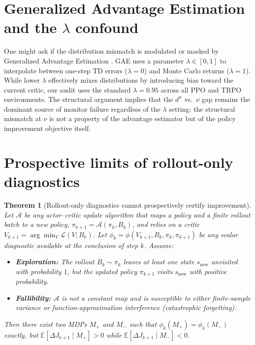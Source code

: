 \documentclass{article}
\newtheorem{theorem}{Theorem}
\begin{document}
\section{Generalized Advantage Estimation and the \texorpdfstring{$\lambda$}{lambda} confound}
\label{app:gae}

One might ask if the distribution mismatch is modulated or masked by Generalized Advantage Estimation \citep{schulman2015high}. GAE uses a parameter $\lambda \in [0,1]$ to interpolate between one-step TD errors ($\lambda=0$) and Monte Carlo returns ($\lambda=1$). While lower $\lambda$ effectively mixes distributions by introducing bias toward the current critic, our audit uses the standard $\lambda=0.95$ across all PPO and TRPO environments. The structural argument implies that the $d^\pi$ vs.\ $\nu$ gap remains the dominant source of monitor failure regardless of the $\lambda$ setting: the structural mismatch at $\nu$ is not a property of the advantage estimator but of the policy improvement objective itself. 

\section{Prospective limits of rollout-only diagnostics}
\label{app:prospective-proof}

\begin{theorem}[Rollout-only diagnostics cannot prospectively certify improvement]
\label{thm:rollout-only}
Let $\mathcal{A}$ be any actor--critic update algorithm that maps a policy and a finite rollout batch to a new policy, $\pi_{k+1} = \mathcal{A}(\pi_k, B_k)$, and relies on a critic $V_{k+1} = \arg\min_V \mathcal{L}(V; B_k)$. Let $\phi_k = \phi(V_{k+1}, B_k, \pi_k, \pi_{k+1})$ be any scalar diagnostic available at the conclusion of step $k$. Assume:
\begin{itemize}
    \item \textbf{Exploration:} The rollout $B_k \sim \pi_k$ leaves at least one state $s_{\mathrm{new}}$ unvisited with probability $1$, but the updated policy $\pi_{k+1}$ visits $s_{\mathrm{new}}$ with positive probability.
    \item \textbf{Fallibility:} $\mathcal{A}$ is not a constant map and is susceptible to either finite-sample variance or function-approximation interference (catastrophic forgetting).
\end{itemize}
Then there exist two MDPs $M_+$ and $M_-$ such that $\phi_k(M_+) = \phi_k(M_-)$ exactly, but $\mathbb{E}[\Delta J_{k+1} \mid M_+] > 0$ while $\mathbb{E}[\Delta J_{k+1} \mid M_-] < 0$.
\end{theorem}
\end{document}
